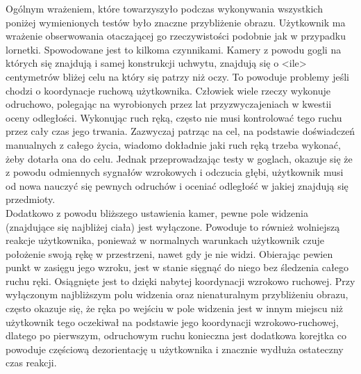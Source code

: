 \documentclass[a4paper,11pt,twoside]{report}
\theoremstyle{definition}
\begin{document}
Ogólnym wrażeniem, które towarzyszyło podczas wykonywania wszystkich poniżej wymienionych testów było znaczne przybliżenie obrazu. Użytkownik ma wrażenie obserwowania otaczającej go rzeczywistości podobnie jak w przypadku lornetki. Spowodowane jest to kilkoma czynnikami. Kamery z powodu gogli na których się znajdują i samej konstrukcji uchwytu, znajdują się o <ile> centymetrów bliżej celu na który się patrzy niż oczy.  To powoduje problemy jeśli chodzi o koordynacje ruchową użytkownika. Człowiek wiele rzeczy wykonuje odruchowo, polegając na wyrobionych przez lat przyzwyczajeniach w kwestii oceny odległości. Wykonując ruch ręką, często nie musi kontrolować tego ruchu przez cały czas jego trwania. Zazwyczaj patrząc na cel, na podstawie doświadczeń manualnych z całego życia, wiadomo dokładnie jaki ruch ręką trzeba wykonać, żeby dotarła ona do celu. Jednak przeprowadzając testy w goglach, okazuje się że z powodu odmiennych sygnałów wzrokowych i odczucia głębi, użytkownik musi od nowa nauczyć się pewnych odruchów i oceniać odległość w jakiej znajdują się przedmioty. \\

Dodatkowo z powodu bliższego ustawienia kamer, pewne pole widzenia  (znajdujące się najbliżej ciała) jest wyłączone. Powoduje to również wolniejszą reakcje użytkownika, ponieważ w normalnych warunkach użytkownik czuje położenie swoją rękę w przestrzeni, nawet gdy je nie widzi. Obierając pewien punkt w zasięgu jego wzroku, jest w stanie sięgnąć do niego bez śledzenia całego ruchu ręki. Osiągnięte jest to dzięki nabytej koordynacji wzrokowo ruchowej. Przy wyłączonym najbliższym polu widzenia oraz nienaturalnym przybliżeniu obrazu, często okazuje się, że ręka po wejściu w pole widzenia jest w innym miejscu niż użytkownik tego oczekiwał na podstawie jego koordynacji wzrokowo-ruchowej, dlatego po pierwszym, odruchowym ruchu konieczna jest dodatkowa korejtka co powoduje częściową dezorientację u użytkownika i znacznie wydłuża ostateczny czas reakcji.
\end{document}
